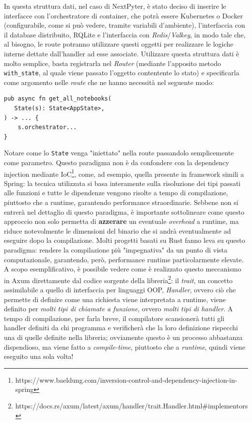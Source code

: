 In questa struttura dati, nel caso di NextPyter, è stato deciso di inserire le interfacce con l'orchestratore di container, che potrà essere Kubernetes o Docker (configurabile, come si può vedere, tramite variabili d'ambiente), l'interfaccia con il database distribuito, RQLite e l'interfaccia con \textit{Redis}/\textit{Valkey}, in modo tale che, al bisogno, le route potranno utilizzare questi oggetti per realizzare le logiche interne dettate dall'handler ad esse associate.
Utilizzare questa struttura dati è molto semplice, basta registrarla nel \textit{Router} (mediante l'apposito metodo \verb|with_state|, al quale viene passato l'oggetto contentente lo stato) e specificarla come argomento nelle \textit{route} che ne hanno necessità nel seguente modo:
\begin{verbatim}
pub async fn get_all_notebooks(
   State(s): State<AppState>,
) -> ... {
    s.orchestrator...
}
\end{verbatim}
Notare come lo \verb|State| venga "iniettato" nella route passandolo semplicemente come parametro. Questo paradigma non è da confondere con la dependency injection mediante IoC\footnote{https://www.baeldung.com/inversion-control-and-dependency-injection-in-spring}, come, ad esempio, quella presente in framework simili a Spring: la tecnica utilizzata si basa interamente sulla risoluzione dei tipi passati alle funzioni e tutte le dipendenze vengono risolte a tempo di compilazione, piuttosto che a runtime, garantendo performance straordinarie.
\newline
Sebbene non si entrerà nel dettaglio di questo paradigma, è importante sottolineare come questo approccio non solo permetta di \textbf{azzerare} un eventuale \textit{overhead} a runtime, ma riduce notevolmente le dimensioni del binario che si andrà eventualmente ad eseguire dopo la compilazione. Molti progetti basati su Rust fanno leva su questo paradigma: rendere la compilazione più "impegnativa" da un punto di vista computazionale, garantendo, però, performance runtime particolarmente elevate.
\newline
A scopo esemplificativo, è possibile vedere come è realizzato questo meccanismo in Axum direttamente dal codice sorgente della libreria\footnote{https://docs.rs/axum/latest/axum/handler/trait.Handler.html#implementors}: il \textit{trait}, un concetto assimilabile a quello di interfaccia per linguaggi OOP, \textit{Handler}, ovvero ciò che permette di definire come una richiesta viene interpretata a runtime, viene definito per \textit{molti tipi di chiamate a funzione}, ovvero \textit{molti tipi di handler}. A tempo di compilazione, per farla breve, il compilatore scansionerà tutti gli handler definiti da chi programma e verificherà che la loro definizione rispecchi una di quelle definite nella libreria; ovviamente questo è un processo abbastanza dispendioso, ma viene fatto a \textit{compile-time}, piuttosto che a \textit{runtime}, quindi viene eseguito una sola volta!
\newline
